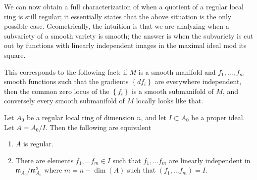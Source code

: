 We can now obtain a full characterization of when a quotient of a regular local
ring is still regular; it essentially states that the above situation is the
only possible case. Geometrically, the intuition is that we are analyzing when
a subvariety of a smooth variety is smooth; the answer is when the subvariety
is cut out by functions with linearly independent images in the maximal ideal
mod its square. 

This corresponds to the following fact: if $M$ is a smooth manifold and $f_1,
\dots, f_m$ smooth functions such that the gradients $\left\{df_i\right\}$ are
everywhere independent, then the common zero locus of the $\left\{f_i\right\}$
is a smooth submanifold of $M$, and conversely every smooth submanifold of $M$
locally looks like that.

\begin{theorem} \label{quotientreg} Let $A_0$ be a regular local ring of dimension $n$, and 
let $I \subset A_0$ be a proper ideal. Let $A = A_0/I$.
 Then the following are equivalent
\begin{enumerate}
\item $A$ is regular.
\item There are elements $f_1, \ldots f_m \in I$ such that $\bar{f_1}, \ldots \bar{f_m}$ are linearly independent in $\mathfrak{m}_{A_0}/\mathfrak{m}_{A_0}^2$ where $m=n-\dim(A)$ such that $(f_1, \ldots f_m)=I$.
\end{enumerate}
\label{reg loc main thm}
\end{theorem}

